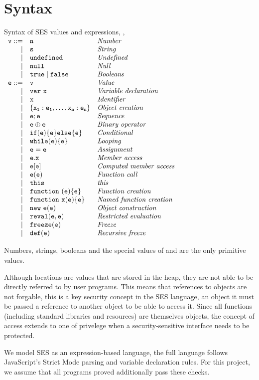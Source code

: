 \documentclass[a4paper,notitlepage]{report}
\begin{document}
  \section{Syntax}
    \newcommand{\syntaxline}[3][\pipe]{#1 & \js{#2} & \textit{#3}\\}
    \begin{display}{Syntax of SES values and expressions, , }
      $\begin{array}{rll}
        \syntaxline[\js{v} ::=]{n}{Number}
        \syntaxline{s}{String}
        \syntaxline{\und}{Undefined}
        \syntaxline{\nil}{Null}
        \syntaxline{\true \pipe \false}{Booleans}
        \syntaxline[\js{e} ::=]{v}{Value}
        \syntaxline{\jsvar{x}}{Variable declaration}
        \syntaxline{x}{Identifier}
        \syntaxline{\{x_1:e_1, \ldots, x_n:e_n\}}{Object creation}
        \syntaxline{e; e}{Sequence}
        \syntaxline{e \oplus e}{Binary operator}
        \syntaxline{if(e) \{e\} else \{e\}}{Conditional}
        \syntaxline{while(e) \{e\}}{Looping}
        \syntaxline{e = e}{Assignment}
        \syntaxline{e.x}{Member access}
        \syntaxline{e[e]}{Computed member access}
        \syntaxline{e(e)}{Function call}
        \syntaxline{this}{this}
        \syntaxline{\jsfun{e}{e}}{Function creation}
        \syntaxline{\jsfun[x]{e}{e}}{Named function creation}
        \syntaxline{\jsnew{e}{e}}{Object construction}
        \syntaxline{reval(e, e)}{Restricted evaluation}
        \syntaxline{freeze(e)}{Freeze}
        \syntaxline{def(e)}{Recursive freeze}
      \end{array}$
    \end{display}

  Numbers, strings, booleans and the special values of \und and \nil are the
  only primitive values.

  Although locations are values that are stored in the heap, they are
  not able to be directly referred to by user programs. This means that
  references to objects are not forgable, this is a key security concept in the
  SES language, an object it must be passed a reference to another object to be
  able to access it.
  Since all functions (including standard libraries and resources) are
  themselves objects, the concept of access extends to one of privelege when a
  security-sensitive interface needs to be protected.

  We model SES as an expression-based language, the full language follows
  JavaScript's Strict Mode parsing and variable declaration rules. For this
  project, we assume that all programs proved additionally pass these checks.
\end{document}
